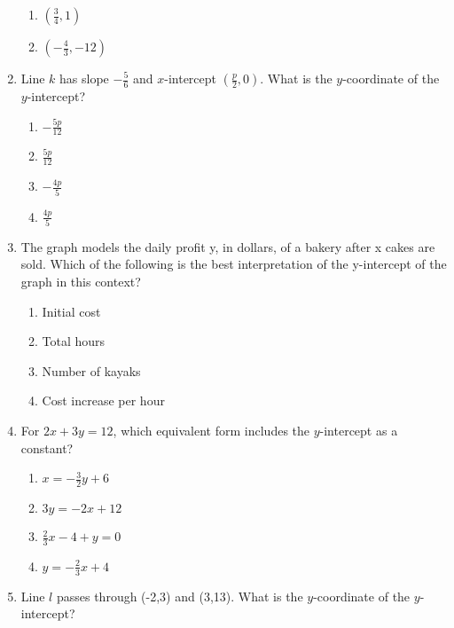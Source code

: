 \documentclass[12pt]{exam}
\begin{document}
\begin{enumerate}
\begin{enumerate}[label=\Alph*)]
        \item $\left( \frac{3}{4}, 1 \right)$
        \item $\left( -\frac{4}{3}, -12 \right)$
    \end{enumerate}
    \item Line $k$ has slope $-\frac{5}{6}$ and $x$-intercept $(\frac{p}{2}, 0)$. What is the $y$-coordinate of the $y$-intercept?
    \begin{enumerate}[label=\Alph*)]
        \item $-\frac{5p}{12}$
        \item $\frac{5p}{12}$
        \item $-\frac{4p}{5}$
        \item $\frac{4p}{5}$
    \end{enumerate}
    \item The graph models the daily profit y, in dollars,
    of a bakery after x cakes are sold. Which of the
    following is the best interpretation of the
    y-intercept of the graph in this context?
    \begin{enumerate}[label=\Alph*)]
        \item Initial cost
        \item Total hours
        \item Number of kayaks
        \item Cost increase per hour
    \end{enumerate}
    \begin{center}
    \end{center}
    \item For $2x + 3y = 12$, which equivalent form includes the $y$-intercept as a constant?
    \begin{enumerate}[label=\Alph*)]
        \item $x = -\frac{3}{2}y + 6$
        \item $3y = -2x + 12$
        \item $\frac{2}{3}x - 4 + y = 0$
        \item $y = -\frac{2}{3}x + 4$
    \end{enumerate}
    \item Line $l$ passes through (-2,3) and (3,13). What is the $y$-coordinate of the $y$-intercept?

\end{enumerate}
\end{document}
